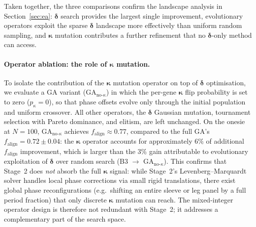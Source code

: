 \noindent
Taken together, the three comparisons confirm the landscape analysis
in Section~\ref{sec:ea}: $\boldsymbol{\delta}$ search provides the
largest single improvement, evolutionary operators exploit the sparse
$\boldsymbol{\delta}$ landscape more effectively than uniform random
sampling, and $\boldsymbol{\kappa}$ mutation contributes a further
refinement that no $\boldsymbol{\delta}$-only method can access.

\paragraph{Operator ablation: the role of $\boldsymbol{\kappa}$ mutation.}
\label{sec:ablation}
To isolate the contribution of the $\boldsymbol{\kappa}$ mutation
operator on top of $\boldsymbol{\delta}$ optimisation, we evaluate a GA
variant ($\text{GA}_{\text{no-}\kappa}$) in which the per-gene
$\boldsymbol{\kappa}$ flip probability is set to zero ($p_\kappa = 0$),
so that phase offsets evolve only through the initial population and
uniform crossover. All other operators, the $\boldsymbol{\delta}$
Gaussian mutation, tournament selection with Pareto dominance, and
elitism, are left unchanged.
On the onesie at $N=100$, $\text{GA}_{\text{no-}\kappa}$ achieves
$f_\text{align} \approx 0.77$, compared to the full GA's
$f_\text{align} = 0.72 \pm 0.04$: the $\boldsymbol{\kappa}$ operator
accounts for approximately 6\% of additional $f_\text{align}$
improvement, which is larger than the 3\% gain attributable to
evolutionary exploitation of $\boldsymbol{\delta}$ over random search
(B3 $\rightarrow$ $\text{GA}_{\text{no-}\kappa}$).
This confirms that Stage~2 does \emph{not} absorb the full
$\boldsymbol{\kappa}$ signal: while Stage~2's Levenberg--Marquardt
solver handles local phase corrections via small rigid translations,
there exist global phase reconfigurations (e.g.\ shifting an entire
sleeve or leg panel by a full period fraction) that only discrete
$\boldsymbol{\kappa}$ mutation can reach.
The mixed-integer operator design is therefore not redundant with
Stage~2; it addresses a complementary part of the search space.


